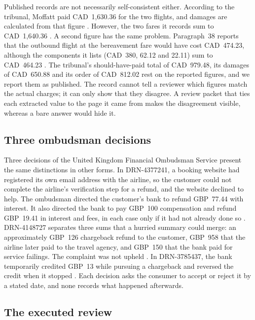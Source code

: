 \documentclass[11pt]{article}
\begin{document}
Published records are not necessarily self-consistent either. According to the tribunal, Moffatt paid CAD~1,630.36 for the two flights, and damages are calculated from that figure \citep[paras.~34, 40]{moffatt2024}. However, the two fares it records sum to CAD~1,640.36 \citep[para.~18]{moffatt2024}. A second figure has the same problem. Paragraph~38 reports that the outbound flight at the bereavement fare would have cost CAD~474.23, although the components it lists (CAD~380, 62.12 and 22.11) sum to CAD~464.23 \citep[para.~38]{moffatt2024}. The tribunal's should-have-paid total of CAD~979.48, its damages of CAD~650.88 and its order of CAD~812.02 rest on the reported figures, and we report them as published. The record cannot tell a reviewer which figures match the actual charges; it can only show that they disagree. A review packet that ties each extracted value to the page it came from makes the disagreement visible, whereas a bare answer would hide it.

\subsection{Three ombudsman decisions}

Three decisions of the United Kingdom Financial Ombudsman Service present the same distinctions in other forms. In DRN-4377241, a booking website had registered its own email address with the airline, so the customer could not complete the airline's verification step for a refund, and the website declined to help. The ombudsman directed the customer's bank to refund GBP~77.44 with interest. It also directed the bank to pay GBP~100 compensation and refund GBP~19.41 in interest and fees, in each case only if it had not already done so . DRN-4148727 separates three sums that a hurried summary could merge: an approximately GBP~126 chargeback refund to the customer, GBP~958 that the airline later paid to the travel agency, and GBP~150 that the bank paid for service failings. The complaint was not upheld . In DRN-3785437, the bank temporarily credited GBP~13 while pursuing a chargeback and reversed the credit when it stopped . Each decision asks the consumer to accept or reject it by a stated date, and none records what happened afterwards.

\subsection{The executed review}
\end{document}
